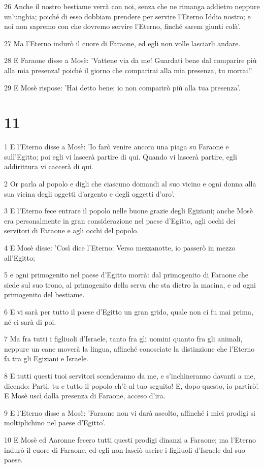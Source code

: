 \par 26 Anche il nostro bestiame verrà con noi, senza che ne rimanga addietro neppure un'unghia; poiché di esso dobbiam prendere per servire l'Eterno Iddio nostro; e noi non sapremo con che dovremo servire l'Eterno, finché sarem giunti colà'.
\par 27 Ma l'Eterno indurò il cuore di Faraone, ed egli non volle lasciarli andare.
\par 28 E Faraone disse a Mosè: 'Vattene via da me! Guardati bene dal comparire più alla mia presenza! poiché il giorno che comparirai alla mia presenza, tu morrai!'
\par 29 E Mosè rispose: 'Hai detto bene; io non comparirò più alla tua presenza'.

\chapter{11}

\par 1 E l'Eterno disse a Mosè: 'Io farò venire ancora una piaga su Faraone e sull'Egitto; poi egli vi lascerà partire di qui. Quando vi lascerà partire, egli addirittura vi caccerà di qui.
\par 2 Or parla al popolo e digli che ciascuno domandi al suo vicino e ogni donna alla sua vicina degli oggetti d'argento e degli oggetti d'oro'.
\par 3 E l'Eterno fece entrare il popolo nelle buone grazie degli Egiziani; anche Mosè era personalmente in gran considerazione nel paese d'Egitto, agli occhi dei servitori di Faraone e agli occhi del popolo.
\par 4 E Mosè disse: 'Così dice l'Eterno: Verso mezzanotte, io passerò in mezzo all'Egitto;
\par 5 e ogni primogenito nel paese d'Egitto morrà: dal primogenito di Faraone che siede sul suo trono, al primogenito della serva che sta dietro la macina, e ad ogni primogenito del bestiame.
\par 6 E vi sarà per tutto il paese d'Egitto un gran grido, quale non ci fu mai prima, né ci sarà di poi.
\par 7 Ma fra tutti i figliuoli d'Israele, tanto fra gli uomini quanto fra gli animali, neppure un cane moverà la lingua, affinché conosciate la distinzione che l'Eterno fa tra gli Egiziani e Israele.
\par 8 E tutti questi tuoi servitori scenderanno da me, e s'inchineranno davanti a me, dicendo: Parti, tu e tutto il popolo ch'è al tuo seguito! E, dopo questo, io partirò'. E Mosè uscì dalla presenza di Faraone, acceso d'ira.
\par 9 E l'Eterno disse a Mosè: 'Faraone non vi darà ascolto, affinché i miei prodigi si moltiplichino nel paese d'Egitto'.
\par 10 E Mosè ed Aaronne fecero tutti questi prodigi dinanzi a Faraone; ma l'Eterno indurò il cuore di Faraone, ed egli non lasciò uscire i figliuoli d'Israele dal suo paese.

